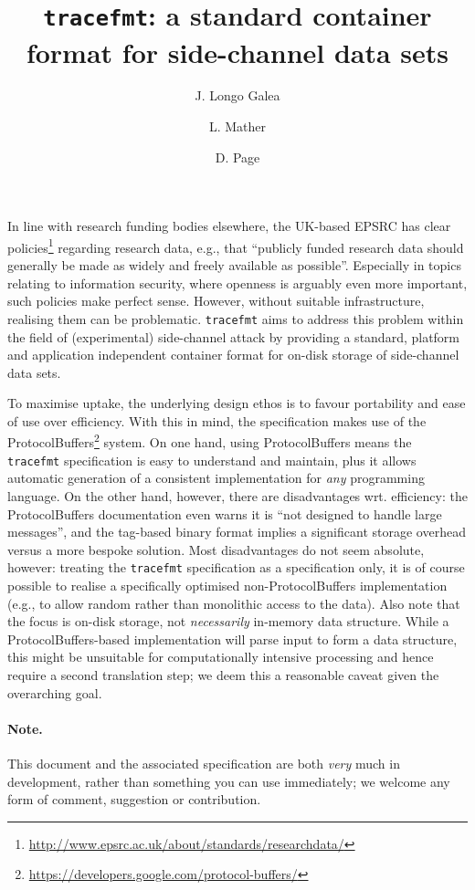\documentclass[10pt,a4paper]{llncs}
\title{{\tt tracefmt}: a standard container format for side-channel data sets}
\author{J. Longo Galea \and L. Mather \and D. Page}
\institute{
Department of Computer Science, University of Bristol,\\
Merchant Venturers Building, Woodland Road,\\
Bristol, BS8 1UB, United Kingdom.\\
\email{\{Jake.Longo,Luke.Mather,Daniel.Page\}@bristol.ac.uk}
}
\begin{document}
\maketitle


In line with research funding bodies elsewhere, the UK-based EPSRC has clear 
policies\footnote{
\url{http://www.epsrc.ac.uk/about/standards/researchdata/}
} regarding research data, e.g., that ``publicly funded research data should 
generally be made as widely and freely available as possible''.  Especially
in topics relating to information security, where openness is arguably even 
more important, such policies make perfect sense.  However, without suitable
infrastructure, realising them can be problematic.  {\tt tracefmt} aims to 
address this problem within the field of (experimental) side-channel attack
by providing a standard, platform and application independent container 
format for on-disk storage of side-channel data sets.

To maximise uptake, the underlying design ethos is to favour portability and
ease of use over efficiency.  With this in mind, the specification makes use
of the {\sf ProtocolBuffers}\footnote{
\url{https://developers.google.com/protocol-buffers/}
} system.  On one hand, using {\sf ProtocolBuffers} means the {\tt tracefmt} 
specification is easy to understand and maintain, plus it allows automatic 
generation of a consistent implementation for {\em any} programming language.  
On the other hand, however, there {\e are} disadvantages wrt. efficiency: the
{\sf ProtocolBuffers} documentation even warns it is ``not designed to handle 
large messages'', and the tag-based binary format implies a significant 
storage overhead versus a more bespoke solution.  Most disadvantages do not
seem absolute, however: treating the {\tt tracefmt} specification as a 
specification only, it is of course possible to realise a specifically
 optimised non-{\sf ProtocolBuffers} implementation (e.g., to allow random 
rather than monolithic access to the data).  Also note that the focus is 
on-disk storage, not {\em necessarily} in-memory data structure.  While a
{\sf ProtocolBuffers}-based implementation will parse input to form a data
structure, this might be unsuitable for computationally intensive processing
and hence require a second translation step; we deem this a reasonable caveat
given the overarching goal.

\paragraph{Note.} 
This document and the associated specification are both {\em very} much in
development, rather than something you can use immediately; we welcome any
form of comment, suggestion or contribution.
\end{document}
